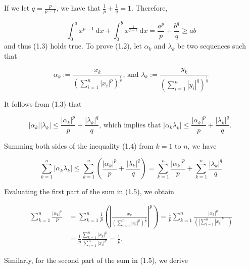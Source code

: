 \documentclass{article}
\begin{document}
If we let $q=\frac{p}{p-1}$, we have that $\frac{1}{p}+\frac{1}{q}=1$. Therefore,

$$
\int_{0}^{a} x^{p-1} \mathrm{~d} x+\int_{0}^{b} x^{\frac{1}{p-1}} \mathrm{~d} x=\frac{a^{p}}{p}+\frac{b^{q}}{q} \geq a b
$$
and thus (1.3) holds true. To prove (1.2), let $\alpha_{k}$ and $\lambda_{k}$ be two sequences such that

$$
\alpha_{k}:=\frac{x_{k}}{\left(\sum_{i=1}^{n}\left|x_{i}\right|^{p}\right)^{\frac{1}{p}}} \text {, and } \lambda_{k}:=\frac{y_{k}}{\left(\sum_{i=1}^{n}\left|y_{i}\right|^{q}\right)^{\frac{1}{q}}}
$$

It follows from (1.3) that

\begin{equation}\tag{1.4}
\left|\alpha_{k}\right|\left|\lambda_{k}\right| \leq \frac{\left|\alpha_{k}\right|^{p}}{p}+\frac{\left|\lambda_{k}\right|^{q}}{q} \text {, which implies that }\left|\alpha_{k} \lambda_{k}\right| \leq \frac{\left|\alpha_{k}\right|^{p}}{p}+\frac{\left|\lambda_{k}\right|^{q}}{q} \text {. }
\end{equation}

Summing both sides of the inequality (1.4) from $k=1$ to $n$, we have

\begin{equation}\tag{1.5}
\sum_{k=1}^{n}\left|\alpha_{k} \lambda_{k}\right| \leq \sum_{k=1}^{n}\left(\frac{\left|\alpha_{k}\right|^{p}}{p}+\frac{\left|\lambda_{k}\right|^{q}}{q}\right)=\sum_{k=1}^{n} \frac{\left|\alpha_{k}\right|^{p}}{p}+\sum_{k=1}^{n} \frac{\left|\lambda_{k}\right|^{q}}{q}
\end{equation}

Evaluating the first part of the sum in (1.5), we obtain

\begin{equation}\tag{1.6}
\begin{aligned}
\sum_{k=1}^{n} \frac{\left|\alpha_{k}\right|^{p}}{p} & =\sum_{k=1}^{n} \frac{1}{p}\left(\left|\frac{x_{k}}{\left(\sum_{i=1}^{n}\left|x_{i}\right|^{p}\right)^{\frac{1}{p}}}\right|^{p}\right)=\frac{1}{p} \sum_{k=1}^{n} \frac{\left|x_{k}\right|^{p}}{\left(\left.\left|\sum_{i=1}^{n}\right| x_{i}\right|^{p} \mid\right)} \\
& =\frac{1}{p} \frac{\sum_{k=1}^{n}\left|x_{k}\right|^{p}}{\sum_{i=1}^{n}\left|x_{i}\right|^{p}}=\frac{1}{p} .
\end{aligned}
\end{equation}

Similarly, for the second part of the sum in (1.5), we derive
\end{document}

